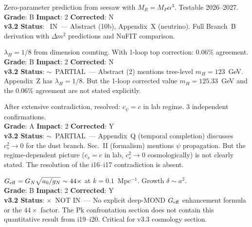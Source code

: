 \documentclass[11pt,a4paper]{article}
\newcommand{\vin}{\textcolor{statusIN}{\checkmark~IN}}
\newcommand{\vpartial}{\textcolor{statusPARTIAL}{$\sim$~PARTIAL}}
\newcommand{\vnot}{\textcolor{statusNOT}{$\times$~NOT IN}}
\begin{document}
\begin{tcolorbox}[colback=major!5,colframe=major,title=\textbf{F15: Neutrino Mass Sum $\Sigma m_\nu = 61.4$~meV}]
Zero-parameter prediction from seesaw with $M_R = M_P \alpha^3$. Testable 2026--2027.\\
\textbf{Grade}: B \quad \textbf{Impact}: 2 \quad \textbf{Corrected}: N\\
\textbf{v3.2 Status}: \vin\ --- Abstract (10b), Appendix~X (neutrino). Full Branch~B derivation with $\Delta m^2$ predictions and NuFIT comparison.
\end{tcolorbox}

\begin{tcolorbox}[colback=major!5,colframe=major,title=\textbf{F16: Higgs Mass from Topology: $m_H = 125.33$~GeV}]
$\lambda_H = 1/8$ from dimension counting. With 1-loop top correction: 0.06\% agreement.\\
\textbf{Grade}: B \quad \textbf{Impact}: 2 \quad \textbf{Corrected}: N\\
\textbf{v3.2 Status}: \vpartial\ --- Abstract (2) mentions tree-level $m_H = 123$~GeV. Appendix~Z has $\lambda_H = 1/8$. But the 1-loop corrected value $m_H = 125.33$~GeV and the 0.06\% agreement are not stated explicitly.
\end{tcolorbox}

\begin{tcolorbox}[colback=major!5,colframe=major,title=\textbf{F17: $\psi$-Field Sound Speed $c_s = c$ in Lab}]
After extensive contradiction, resolved: $c_\psi = c$ in lab regime. 3 independent confirmations.\\
\textbf{Grade}: A \quad \textbf{Impact}: 2 \quad \textbf{Corrected}: Y\\
\textbf{v3.2 Status}: \vpartial\ --- Appendix~Q (temporal completion) discusses $c_s^2 \to 0$ for the dust branch. Sec.~II (formalism) mentions $\psi$ propagation. But the regime-dependent picture ($c_s = c$ in lab, $c_s^2 \to 0$ cosmologically) is not clearly stated. The resolution of the i16--i17 contradiction is absent.
\end{tcolorbox}

\begin{tcolorbox}[colback=major!5,colframe=major,title=\textbf{F18: Deep-MOND $G_{\rm eff}$ Enhancement Resolves Structure Formation}]
$G_{\rm eff} = G_N \sqrt{a_0/g_N} \sim 44\times$ at $k = 0.1$~Mpc$^{-1}$. Growth $\delta \sim a^2$.\\
\textbf{Grade}: B \quad \textbf{Impact}: 2 \quad \textbf{Corrected}: Y\\
\textbf{v3.2 Status}: \vnot\ --- No explicit deep-MOND $G_{\rm eff}$ enhancement formula or the $44\times$ factor. The Pk confrontation section does not contain this quantitative result from i19--i20. Critical for v3.3 cosmology section.
\end{tcolorbox}
\end{document}
